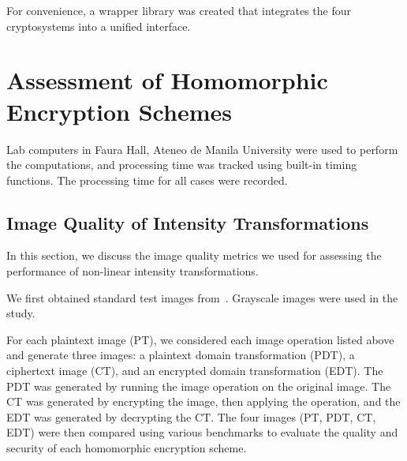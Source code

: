 For convenience, a wrapper library was created that integrates the four cryptosystems into a unified interface.




\section{Assessment of Homomorphic Encryption Schemes}

Lab computers in Faura Hall, Ateneo de Manila University were used to perform the computations, and processing time was tracked using built-in timing functions. The processing time for all cases were recorded.

\subsection{Image Quality of Intensity Transformations}
In this section, we discuss the image quality metrics we used for assessing the performance of non-linear intensity transformations.

We first obtained standard test images from~\cite{gonzalez_image_nodate}. Grayscale images were used in the study.

For each plaintext image (PT), we considered each image operation listed above and generate three images: a plaintext domain transformation (PDT), a ciphertext image (CT), and an encrypted domain transformation (EDT). The PDT was generated by running the image operation on the original image. The CT was generated by encrypting the image, then applying the operation, and the EDT was generated by decrypting the CT. The four images (PT, PDT, CT, EDT) were then compared using various benchmarks to evaluate the quality and security of each homomorphic encryption scheme.

